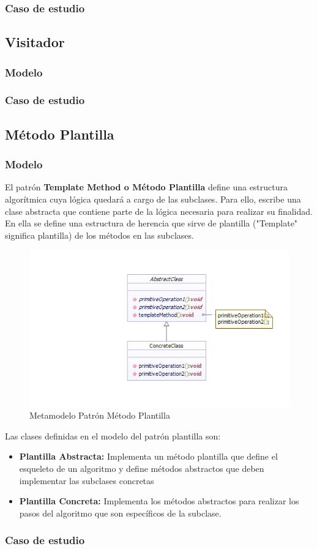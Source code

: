 \subsubsection{Caso de estudio}
\newpage

\subsection{Visitador}
\subsubsection{Modelo}
\newpage
\subsubsection{Caso de estudio}
\newpage

\subsection{Método Plantilla}
\subsubsection{Modelo}

El patrón \textbf{Template Method o Método Plantilla} define una estructura algorítmica cuya lógica quedará a cargo de las subclases. Para ello, escribe una clase abstracta que contiene parte de la lógica necesaria para realizar su finalidad. En ella se define una estructura de herencia que sirve de plantilla ("Template" significa plantilla) de los métodos en las subclases.

\begin{figure}[th!]
	\centering
	\includegraphics[width=0.6\linewidth]{arquitectura/imagenes/ModeloPlantilla}
	\caption{Metamodelo Patrón Método Plantilla}
	\label{fig:metamodelo patron metodo plantilla}
\end{figure}

Las clases definidas en el modelo del patrón plantilla son:
\begin{itemize}
	\item \textbf{Plantilla Abstracta: }Implementa un método plantilla que define el esqueleto de un algoritmo y define métodos abstractos que deben implementar las subclases concretas
	\item \textbf{Plantilla Concreta: }Implementa los métodos abstractos para realizar los pasos del algoritmo que son específicos de la subclase.
\end{itemize}

\subsubsection{Caso de estudio}


\newpage